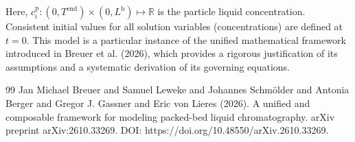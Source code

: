 \documentclass{article}
\begin{document}
Here, $c^{\mathrm{p}}_{i}\colon (0, T^{\mathrm{end}}) \times (0, L^{\mathrm{b}}) \mapsto \mathbb{R}$ is the particle liquid concentration.
Consistent initial values for all solution variables (concentrations) are defined at $t = 0$.
This model is a particular instance of the unified mathematical framework introduced in Breuer et al. (2026), which provides a rigorous justification of its assumptions and a systematic derivation of its governing equations.
\begin{thebibliography}{99}
     Jan Michael Breuer and Samuel Leweke and Johannes Schmölder and Antonia Berger and Gregor J. Gassner and Eric von Lieres (2026). A unified and composable framework for modeling packed-bed liquid chromatography. arXiv preprint arXiv:2610.33269. DOI: https://doi.org/10.48550/arXiv.2610.33269.
\end{thebibliography}
\end{document}
